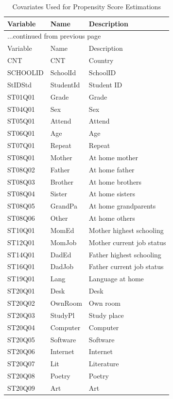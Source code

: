 \documentclass[nojss]{jss}
\begin{document}
\begin{longtable}{lll}
\caption{Covariates Used for Propensity Score Estimations} \\ 
  \hline
  Variable & Name & Description \\ \endfirsthead \multicolumn{3}{l}{{...continued from previous page}}\\ \hline Variable & Name & Description  \\ \hline \endhead \hline
CNT & CNT & Country \\ 
  SCHOOLID & SchoolId & SchoolID \\ 
  StIDStd & StudentId & Student ID \\ 
  ST01Q01 & Grade & Grade \\ 
  ST04Q01 & Sex & Sex \\ 
  ST05Q01 & Attend & Attend \\ 
  ST06Q01 & Age & Age \\ 
  ST07Q01 & Repeat & Repeat \\ 
  ST08Q01 & Mother & At home mother \\ 
  ST08Q02 & Father & At home father \\ 
  ST08Q03 & Brother & At home brothers \\ 
  ST08Q04 & Sister & At home sisters \\ 
  ST08Q05 & GrandPa & At home grandparents \\ 
  ST08Q06 & Other & At home others \\ 
  ST10Q01 & MomEd & Mother highest schooling \\ 
  ST12Q01 & MomJob & Mother current job status \\ 
  ST14Q01 & DadEd & Father highest schooling \\ 
  ST16Q01 & DadJob & Father current job status \\ 
  ST19Q01 & Lang & Language at home \\ 
  ST20Q01 & Desk & Desk \\ 
  ST20Q02 & OwnRoom & Own room \\ 
  ST20Q03 & StudyPl & Study place \\ 
  ST20Q04 & Computer & Computer \\ 
  ST20Q05 & Software & Software \\ 
  ST20Q06 & Internet & Internet \\ 
  ST20Q07 & Lit & Literature \\ 
  ST20Q08 & Poetry & Poetry \\ 
  ST20Q09 & Art & Art \\ 

\end{longtable}
\end{document}
